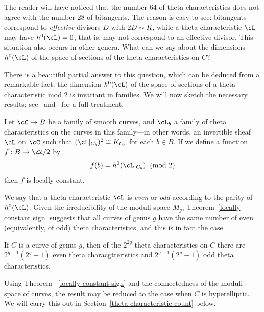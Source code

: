   
The reader will have noticed that the number 64 of theta-characteristics does not agree with the number 28 of bitangents. The reason is easy to see: bitangents correspond to \emph{effective} divisors $D$ with $2D \sim K$, while a theta characteristic $\cL$ may have $h^0(\cL) = 0$, that is, may not correspond to an effective divisor. 
This situation also occurs in other genera. 
What can we say about the dimensions $h^0(\cL)$ of the space of sections of the theta-characteristics on $C$?
 
 There is a beautiful partial answer to this question, which can be deduced from a remarkable fact: the dimension $h^0(\cL)$ of the space of sections of a theta characteristic mod 2 is invariant in families.
We will now
sketch the necessary results; see~\cite{MumfordPaper} and~\cite{JHPaper} for a full treatment.

 \begin{theorem}\label{locally constant sign} Let $\cC \to B$ be a family of smooth curves, and $\cL_b$ a family of theta characteristics on the curves in this family---in other words, an invertible sheaf $\cL$ on $\cC$ such that $(\cL|_{C_b})^2 \cong K_{C_b}$ for each $b \in B$. If we define a function $f : B \to \ZZ/2$  by
 $$
 f(b) = h^0(\cL|_{C_b}) \;  \; (\text{mod } 2)
 $$
then $f$ is locally constant.
\end{theorem}

We say that a theta-characteristic $\cL$ is \emph{even} or \emph{odd} according to the parity of $h^0(\cL)$. Given the irreducibility of the moduli space $M_g$,  Theorem~\ref{locally constant sign} suggests that all curves of genus $g$ have the same number of even (equivalently, of odd) theta characteristics, and this is in fact the case. 

\begin{theorem}\label{number of theta characteristics}
If $C$ is a curve of genus $g$, then of the $2^{2g}$ theta-characteristics on $C$ there are $2^{g-1}(2^g + 1)$ even theta characgtteristics and $2^{g-1}(2^g-1)$ odd theta characteristics.
\end{theorem}

Using Theorem ~\ref{locally constant sign} and the connectedness of the moduli space of curves, 
the result may be reduced to the case when $C$ is hyperelliptic. We will carry this out in Section~\ref{theta characteristic count} below.

